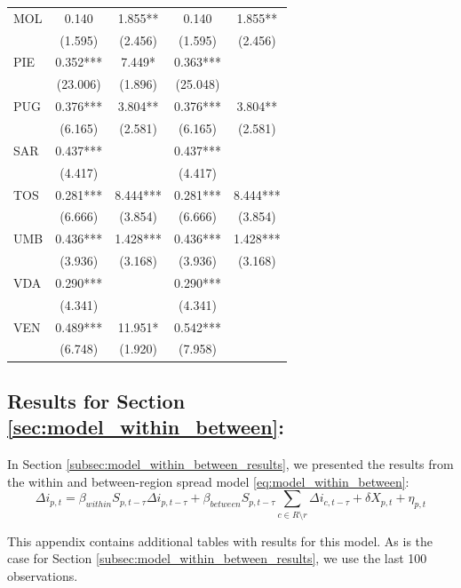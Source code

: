 \documentclass[12pt]{article}
\begin{document}
\begin{appendices}
\begin{longtable}{@{}lcccc@{}}
            MOL & 0.140 & 1.855** & 0.140 & 1.855** \\ 
             & (1.595) & (2.456) & (1.595) & (2.456) \\ 
            PIE & 0.352*** & 7.449* & 0.363*** &  \\ 
             & (23.006) & (1.896) & (25.048) &  \\ 
            PUG & 0.376*** & 3.804** & 0.376*** & 3.804** \\ 
             & (6.165) & (2.581) & (6.165) & (2.581) \\ 
            SAR & 0.437*** &  & 0.437*** &  \\ 
             & (4.417) &  & (4.417) &  \\ 
            TOS & 0.281*** & 8.444*** & 0.281*** & 8.444*** \\ 
             & (6.666) & (3.854) & (6.666) & (3.854) \\ 
            UMB & 0.436*** & 1.428*** & 0.436*** & 1.428*** \\ 
             & (3.936) & (3.168) & (3.936) & (3.168) \\ 
            VDA & 0.290*** &  & 0.290*** & \\ 
             & (4.341) &  & (4.341) &  \\ 
            VEN & 0.489*** & 11.951* & 0.542*** &  \\ 
             & (6.748) & (1.920) & (7.958) &  \\* \bottomrule
        \end{longtable}
		
		\subsection{Results for Section \ref{sec:model_within_between}: } \label{sapp:model_within_between_results}
		In Section \ref{subsec:model_within_between_results}, we presented the results from the within and between-region spread model \eqref{eq:model_within_between}:
		    \begin{equation*}
        		\Delta i_{p,t} = \beta_{within}S_{p,t-\tau}\Delta i_{p,t-\tau} + \beta_{between}S_{p,t-\tau}\sum_{c \in R \setminus r} \Delta i_{c, t-\tau} + \delta X_{p,t} + \eta_{p,t}
        	\end{equation*}
        
        This appendix contains additional tables with results for this model. As is the case for Section \ref{subsec:model_within_between_results}, we use the last 100 observations.
		

\end{appendices}
\end{document}
